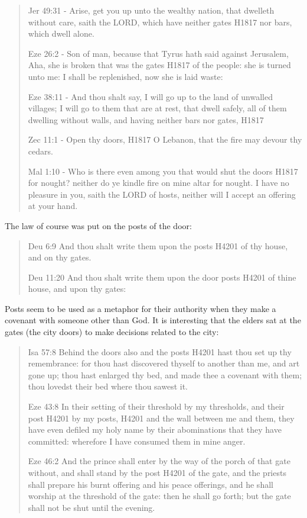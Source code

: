 \documentclass[11pt]{article}
\begin{document}
\begin{quote}
Jer 49:31 - Arise, get you up unto the wealthy nation, that dwelleth without care, saith the LORD, which have neither gates H1817 nor bars, which dwell alone.

Eze 26:2 - Son of man, because that Tyrus hath said against Jerusalem, Aha, she is broken that was the gates H1817 of the people: she is turned unto me: I shall be replenished, now she is laid waste:


Eze 38:11 - And thou shalt say, I will go up to the land of unwalled villages; I will go to them that are at rest, that dwell safely, all of them dwelling without walls, and having neither bars nor gates, H1817

Zec 11:1 - Open thy doors, H1817 O Lebanon, that the fire may devour thy cedars.

Mal 1:10 - Who is there even among you that would shut the doors H1817 for nought? neither do ye kindle fire on mine altar for nought. I have no pleasure in you, saith the LORD of hosts, neither will I accept an offering at your hand.
\end{quote}

The law of course was put on the posts of the door:
\begin{quote}
Deu 6:9
And thou shalt write them upon the posts H4201 of thy house, and on thy gates.

Deu 11:20
And thou shalt write them upon the door posts H4201 of thine house, and upon thy gates:
\end{quote}

Posts seem to be used as a metaphor for their authority when they make a covenant with someone other than God. It is interesting that the elders sat at the gates (the city doors) to make decisions related to the city:
\begin{quote}
Isa 57:8
Behind the doors also and the posts H4201 hast thou set up thy remembrance: for thou hast discovered thyself to another than me, and art gone up; thou hast enlarged thy bed, and made thee a covenant with them; thou lovedst their bed where thou sawest it.

Eze 43:8
In their setting of their threshold by my thresholds, and their post H4201 by my posts, H4201 and the wall between me and them, they have even defiled my holy name by their abominations that they have committed: wherefore I have consumed them in mine anger.

Eze 46:2
And the prince shall enter by the way of the porch of that gate without, and shall stand by the post H4201 of the gate, and the priests shall prepare his burnt offering and his peace offerings, and he shall worship at the threshold of the gate: then he shall go forth; but the gate shall not be shut until the evening.
\end{quote}
\end{document}
